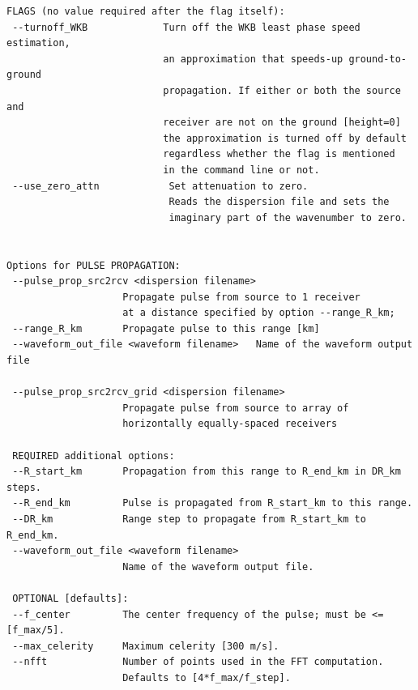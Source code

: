 \begin{verbatim}
FLAGS (no value required after the flag itself):
 --turnoff_WKB             Turn off the WKB least phase speed estimation,
                           an approximation that speeds-up ground-to-ground
                           propagation. If either or both the source and 
                           receiver are not on the ground [height=0] 
                           the approximation is turned off by default
                           regardless whether the flag is mentioned
                           in the command line or not.
 --use_zero_attn            Set attenuation to zero.
                            Reads the dispersion file and sets the
                            imaginary part of the wavenumber to zero.


Options for PULSE PROPAGATION:
 --pulse_prop_src2rcv <dispersion filename> 
                    Propagate pulse from source to 1 receiver
                    at a distance specified by option --range_R_km; 
 --range_R_km       Propagate pulse to this range [km]
 --waveform_out_file <waveform filename>   Name of the waveform output file

 --pulse_prop_src2rcv_grid <dispersion filename> 
                    Propagate pulse from source to array of 
                    horizontally equally-spaced receivers

 REQUIRED additional options:
 --R_start_km       Propagation from this range to R_end_km in DR_km steps.
 --R_end_km         Pulse is propagated from R_start_km to this range.
 --DR_km            Range step to propagate from R_start_km to R_end_km.
 --waveform_out_file <waveform filename> 
                    Name of the waveform output file.

 OPTIONAL [defaults]:
 --f_center         The center frequency of the pulse; must be <= [f_max/5].
 --max_celerity     Maximum celerity [300 m/s].
 --nfft             Number of points used in the FFT computation. 
                    Defaults to [4*f_max/f_step].



\end{verbatim}

